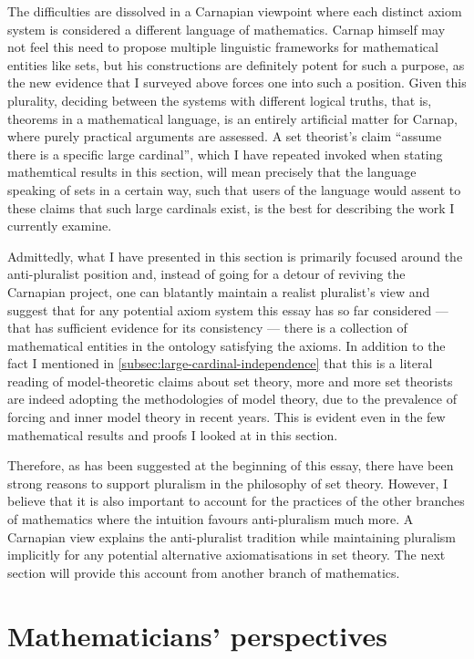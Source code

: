\documentclass[12pt]{article}
\theoremstyle{plain}
\theoremstyle{definition}
\begin{document}
The difficulties are dissolved in a Carnapian viewpoint where each distinct axiom system is considered a different language of mathematics. Carnap himself may not feel this need to propose multiple linguistic frameworks for mathematical entities like sets, but his constructions are definitely potent for such a purpose, as the new evidence that I surveyed above forces one into such a position. Given this plurality, deciding between the systems with different logical truths, that is, theorems in a mathematical language, is an entirely artificial matter for Carnap, where purely practical arguments are assessed. A set theorist's claim ``assume there is a specific large cardinal'', which I have repeated invoked when stating mathemtical results in this section, will mean precisely that the language speaking of sets in a certain way, such that users of the language would assent to these claims that such large cardinals exist, is the best for describing the work I currently examine.

Admittedly, what I have presented in this section is primarily focused around the anti-pluralist position and, instead of going for a detour of reviving the Carnapian project, one can blatantly maintain a realist pluralist's view and suggest that for any potential axiom system this essay has so far considered --- that has sufficient evidence for its consistency --- there is a collection of mathematical entities in the ontology satisfying the axioms. In addition to the fact I mentioned in \autoref{subsec:large-cardinal-independence} that this is a literal reading of model-theoretic claims about set theory, more and more set theorists are indeed adopting the methodologies of model theory, due to the prevalence of forcing and inner model theory in recent years. This is evident even in the few mathematical results and proofs I looked at in this section.

Therefore, as has been suggested at the beginning of this essay, there have been strong reasons to support pluralism in the philosophy of set theory. However, I believe that it is also important to account for the practices of the other branches of mathematics where the intuition favours anti-pluralism much more. A Carnapian view explains the anti-pluralist tradition while maintaining pluralism implicitly for any potential alternative axiomatisations in set theory. The next section will provide this account from another branch of mathematics.

\section{Mathematicians' perspectives}
\label{sec:mathematicians-perspectives}
\end{document}
